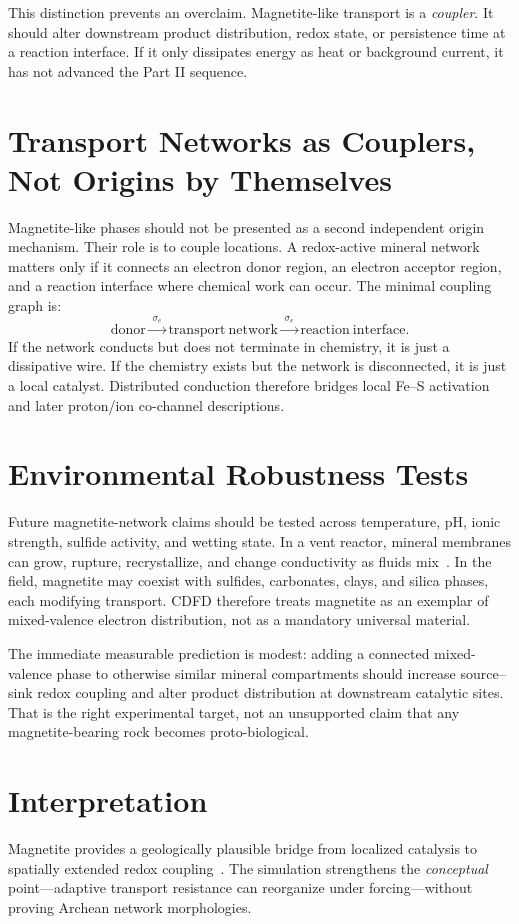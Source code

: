 \documentclass[11pt,a4paper]{article}
\begin{document}
This distinction prevents an overclaim. Magnetite-like transport is a \emph{coupler}. It should alter downstream product distribution, redox state, or persistence time at a reaction interface. If it only dissipates energy as heat or background current, it has not advanced the Part II sequence.

\section{Transport Networks as Couplers, Not Origins by Themselves}
Magnetite-like phases should not be presented as a second independent origin mechanism. Their role is to couple locations. A redox-active mineral network matters only if it connects an electron donor region, an electron acceptor region, and a reaction interface where chemical work can occur. The minimal coupling graph is:
\begin{equation}
\mathrm{donor}
\xrightarrow{\;\sigma_e\;}
\mathrm{transport\ network}
\xrightarrow{\;\sigma_e\;}
\mathrm{reaction\ interface}.
\end{equation}
If the network conducts but does not terminate in chemistry, it is just a dissipative wire. If the chemistry exists but the network is disconnected, it is just a local catalyst. Distributed conduction therefore bridges local Fe--S activation and later proton/ion co-channel descriptions.

\section{Environmental Robustness Tests}
Future magnetite-network claims should be tested across temperature, pH, ionic
strength, sulfide activity, and wetting state. In a vent reactor, mineral
membranes can grow, rupture, recrystallize, and change conductivity as fluids
mix~\cite{Barge2014}. In the field, magnetite may coexist with sulfides,
carbonates, clays, and silica phases, each modifying transport. CDFD therefore
treats magnetite as an exemplar of mixed-valence electron distribution, not as
a mandatory universal material.

The immediate measurable prediction is modest: adding a connected mixed-valence phase to otherwise similar mineral compartments should increase source--sink redox coupling and alter product distribution at downstream catalytic sites. That is the right experimental target, not an unsupported claim that any magnetite-bearing rock becomes proto-biological.

\section{Interpretation}
Magnetite provides a geologically plausible bridge from localized catalysis to spatially extended redox coupling~\cite{Skomurski2010}. The simulation strengthens the \emph{conceptual} point---adaptive transport resistance can reorganize under forcing---without proving Archean network morphologies.
\end{document}

